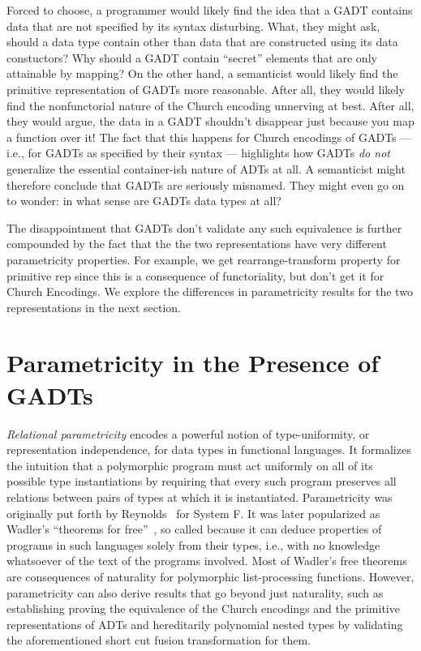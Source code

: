 \documentclass[acmsmall,screen,review,anonymous]{acmart}
\theoremstyle{definition}
\begin{document}
Forced to choose, a programmer would likely find the idea that a GADT
contains data that are not specified by its syntax disturbing. What,
they might ask, should a data type contain other than data that are
constructed using its data constuctors? Why should a GADT contain
``secret'' elements that are only attainable by mapping? On the other
hand, a semanticist would likely find the primitive representation of
GADTs more reasonable. After all, they would likely find the
nonfunctorial nature of the Church encoding unnerving at best. After
all, they would argue, the data in a GADT shouldn't disappear just
because you map a function over it! The fact that this happens for
Church encodings of GADTs --- i.e., for GADTs as specified by their
syntax --- highlights how GADTs {\em do not} generalize the essential
container-ish nature of ADTs at all. A semanticist might therefore
conclude that GADTs are seriously misnamed. They might even go on to
wonder: in what sense are GADTs data types at all?

The disappointment that GADTs don't validate any such equivalence is
further compounded by the fact that the the two representations have
very different parametricity properties.  {\color{blue} For example,
  we get rearrange-transform property for primitive rep since this is
  a consequence of functoriality, but don't get it for Church
  Encodings.} We explore the differences in parametricity results for
the two representations in the next section.

\section{Parametricity in the Presence of GADTs}

{\em Relational parametricity} encodes a powerful notion of
type-uniformity, or representation independence, for data types in
functional languages. It formalizes the intuition that a polymorphic
program must act uniformly on all of its possible type instantiations
by requiring that every such program preserves all relations between
pairs of types at which it is instantiated. Parametricity was
originally put forth by Reynolds~\cite{rey83} for System F. It was
later popularized as Wadler's ``theorems for free''~\cite{wad89}, so
called because it can deduce properties of programs in such languages
solely from their types, i.e., with no knowledge whatsoever of the
text of the programs involved.  Most of Wadler's free theorems are
consequences of naturality for polymorphic list-processing
functions. However, parametricity can also derive results that go
beyond just naturality, such as establishing {\color{blue} proving}
the equivalence of the Church encodings and the primitive
representations of ADTs and {\color{blue} hereditarily polynomial}
nested types by validating the aforementioned short cut fusion
transformation for them.
\end{document}
